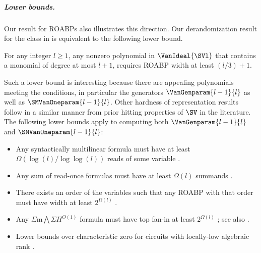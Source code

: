 \documentclass{toc}
\begin{document}
\subparagraph{Lower bounds.}
Our result for ROABPs also illustrates this direction. Our derandomization result for the class in  is equivalent to the following lower bound. 
\begin{theorem}
  \label{thm.roabp.lb}
  For any integer $l \ge 1$, any nonzero polynomial in $\VanIdeal{\SVl}$ that contains a monomial of degree at most $l+1$, requires ROABP width at least $(l/3)+1$.
\end{theorem}
Such a lower bound is interesting because there are appealing polynomials meeting the conditions, in particular the generators $\VanGenparam{l-1}{l}$ as well as $\SMVanOneparam{l-1}{l}$.
Other hardness of representation results follow in a similar manner from prior hitting properties of $\SV$ in the literature.
The following lower bounds apply to computing both
\(\VanGenparam{l-1}{l}\) and \(\SMVanOneparam{l-1}{l}\):
\begin{itemize}
  \item
    Any syntactically multilinear formula must have at least
    \(\Omega(\log(l)/\log\log(l))\) reads of some variable
    \cite[Theorem~6.3]{AvMV2011}.
  \item
    Any sum of read-once formulas must have at least \(\Omega(l)\) summands
    \cite[Corollary~5.2]{MinahanVolkovich2017}.
  \item
    There exists an order of the variables such that any ROABP with that order
    must have width at least \(2^{\Omega(l)}\)
    \cite[Corollary~4.3]{FSS2014}.
  \item
    Any \(\Sigma\mathrm{m}\bigwedge\Sigma\Pi^{O(1)}\) formula must have top
    fan-in at least \(2^{\Omega(l)}\)
    \cite{Forbes2015}; 
    see also \cite[Lemma~5.12]{FSV2018}.
  \item
    Lower bounds over characteristic zero for circuits with locally-low
    algebraic rank
    \cite[Lemma~5.2]{KumarSaraf2016}.
\end{itemize}
\end{document}
